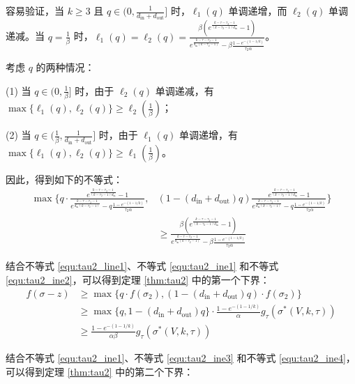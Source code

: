 容易验证，当 $k\ge 3$ 且 $q\in (0,\frac{1}{d_{\text{in}}+d_{\text{out}}}]$ 时，$\ell_1(q)$ 单调递增，而 $\ell_2(q)$ 单调递减。当 $q=\frac{1}{\beta}$ 时，$\ell_1(q)=\ell_2(q)=\frac{\beta(e^{\frac{k-\tau-\tau_2-1}{(k-\tau_2-1)d_{\text{in}}}}-1)}{e^{\frac{k-\tau-\tau_2-1}
{d_{\text{in}}(k-\tau_2-1)}}-\beta \frac{1-e^{-(1-1/k)}}{\tau_2\alpha} }$。

考虑 $q$ 的两种情况：

(1) 当 $q \in (0,\frac{1}{\beta}]$ 时，由于 $\ell_2(q)$ 单调递减，有 $\max\{\ell_1(q),\ell_2(q)\}\ge \ell_2(\frac{1}{\beta})$；

(2) 当 $q \in (\frac{1}{\beta},\frac{1}{d_{\text{in}}+d_{\text{out}}}]$ 时，由于 $\ell_1(q)$ 单调递增，有 $\max\{\ell_1(q),\ell_2(q)\}\ge \ell_1(\frac{1}{\beta})$。

因此，得到如下的不等式：
\begin{align}
\max\{ q \cdot \frac{e^{\frac{k-\tau-\tau_2-1}{(k-\tau_2-1)d_{\text{in}}}}-1}{e^{\frac{k-\tau-\tau_2-1}
{d_{\text{in}}(k-\tau_2-1)}}-q \frac{1-e^{-(1-1/k)}}{\tau_2\alpha} } ,& (1-(d_{\text{in}} + d_{\text{out}})q) \frac{e^{\frac{k-\tau-\tau_2-1}{(k-\tau_2-1)d_{\text{in}}}}-1}{e^{\frac{k-\tau-\tau_2-1}
{d_{\text{in}}(k-\tau_2-1)}}-q \frac{1-e^{-(1-1/k)}}{\tau_2\alpha} } \} \nonumber \\& \ge
\frac{\beta(e^{\frac{k-\tau-\tau_2-1}{(k-\tau_2-1)d_{\text{in}}}}-1)}{e^{\frac{k-\tau-\tau_2-1}
{d_{\text{in}}(k-\tau_2-1)}}-\beta \frac{1-e^{-(1-1/k)}}{\tau_2\alpha} } \label{equ:tau2_ine4}
\end{align}

结合不等式 \ref{equ:tau2_line1}、不等式 \ref{equ:tau2_ine1} 和不等式 \ref{equ:tau2_ine2}，可以得到定理 \ref{thm:tau2} 中的第一个下界：
\begin{align}
f(\sigma -z ) & \ge \max\{ q \cdot f(\sigma_2),(1-(d_{\text{in}} + d_{\text{out}})q) \cdot f(\sigma_2)\} \\
& \ge \max\{q,1-(d_{\text{in}} + d_{\text{out}})q\} \cdot \frac{1-e^{-(1-1/k)}}{\alpha} g_\tau(\sigma^*(V,k,\tau)) \\
& \ge \frac{1-e^{-(1-1/k)}}{\alpha\beta} g_\tau(\sigma^*(V,k,\tau))
\end{align}

结合不等式 \ref{equ:tau2_ine1}、不等式 \ref{equ:tau2_ine3} 和不等式 \ref{equ:tau2_ine4}，可以得到定理 \ref{thm:tau2} 中的第二个下界：

